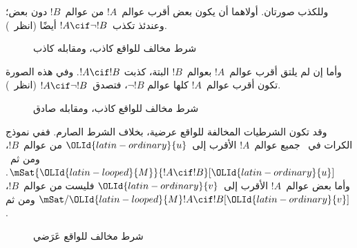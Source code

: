 \documentclass[../../../include/open-logic-section]{subfiles}
\begin{document}
وللكذب صورتان. أولاهما أن يكون بعض أقرب عوالم~$!A$ من عوالم~$!B$
دون بعض؛ وعندئذ تكذب~$!A \cif \lnot !B$ أيضًا
(انظر~).
\begin{figure}
\begin{center}
\caption{شرط مخالف للواقع كاذب، ومقابله كاذب}
\end{center}
\end{figure}
وأما إن لم يلتق أقرب عوالم~$!A$ بعوالم~$!B$ البتة، كذبت
$!A \cif !B$. وفي هذه الصورة تكون أقرب عوالم~$!A$ كلها عوالم
$\lnot !B$، فتصدق~$!A \cif \lnot !B$
(انظر~).
\begin{figure}
\begin{center}
\caption{شرط مخالف للواقع كاذب، ومقابله صادق}
\end{center}
\end{figure}

وقد تكون الشرطيات المخالفة للواقع عرضية، بخلاف الشرط الصارم. ففي نموذج
الكرات في~ جميع عوالم~$!A$ الأقرب إلى~${\OLId{latin-ordinary}{u}}$ من
عوالم~$!B$، ومن ثم~$\mSat{{\OLId{latin-looped}{M}}}{!A \cif !B}[{\OLId{latin-ordinary}{u}}]$. وأما بعض عوالم~$!A$
الأقرب إلى~${\OLId{latin-ordinary}{v}}$ فليست من عوالم~$!B$، ومن ثم
$\mSat/{{\OLId{latin-looped}{M}}}{!A \cif !B}[{\OLId{latin-ordinary}{v}}]$.
\begin{figure}
\begin{center}
\end{center}
\caption{شرط مخالف للواقع عَرَضي}
\end{figure}
\end{document}
